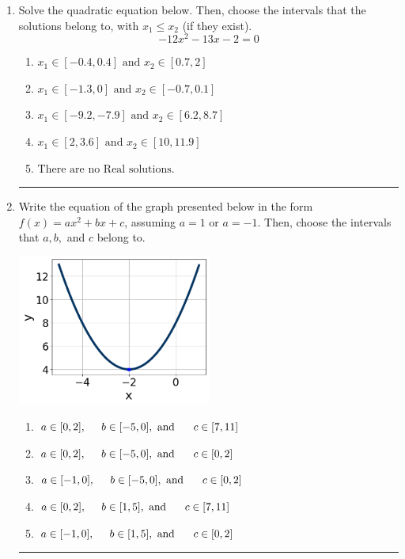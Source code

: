 \documentclass[14pt]{extbook}
\newcommand{\litem}[1]{\item#1\hspace*{-1cm}\rule{\textwidth}{0.4pt}}
\begin{document}
\begin{enumerate}
{\begin{enumerate}[label=\Alph*.]
\end{enumerate} }
\litem{
Solve the quadratic equation below. Then, choose the intervals that the solutions belong to, with $x_1 \leq x_2$ (if they exist).\[ -12x^{2} -13 x -2 = 0 \]\begin{enumerate}[label=\Alph*.]
\item \( x_1 \in [-0.4, 0.4] \text{ and } x_2 \in [0.7, 2] \)
\item \( x_1 \in [-1.3, 0] \text{ and } x_2 \in [-0.7, 0.1] \)
\item \( x_1 \in [-9.2, -7.9] \text{ and } x_2 \in [6.2, 8.7] \)
\item \( x_1 \in [2, 3.6] \text{ and } x_2 \in [10, 11.9] \)
\item \( \text{There are no Real solutions.} \)

\end{enumerate} }
\litem{
Write the equation of the graph presented below in the form $f(x)=ax^2+bx+c$, assuming  $a=1$ or $a=-1$. Then, choose the intervals that $a, b,$ and $c$ belong to.
\begin{center}
    \includegraphics[width=0.5\textwidth]{../Figures/quadraticGraphToEquationA.png}
\end{center}
\begin{enumerate}[label=\Alph*.]
\item \( a \in [0, 2], \hspace*{5mm} b \in [-5, 0], \text{ and } \hspace*{5mm} c \in [7, 11] \)
\item \( a \in [0, 2], \hspace*{5mm} b \in [-5, 0], \text{ and } \hspace*{5mm} c \in [0, 2] \)
\item \( a \in [-1, 0], \hspace*{5mm} b \in [-5, 0], \text{ and } \hspace*{5mm} c \in [0, 2] \)
\item \( a \in [0, 2], \hspace*{5mm} b \in [1, 5], \text{ and } \hspace*{5mm} c \in [7, 11] \)
\item \( a \in [-1, 0], \hspace*{5mm} b \in [1, 5], \text{ and } \hspace*{5mm} c \in [0, 2] \)


\end{enumerate}}
\end{enumerate}
\end{document}
